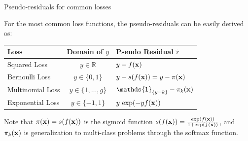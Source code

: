 \documentclass[11pt,compress,t,notes=noshow, xcolor=table]{beamer}
\begin{document}
\begin{vbframe}{Pseudo-residuals for common losses}

For the most common loss functions, the pseudo-residuals can be easily derived as:

\lz

\begin{table}[ht]
\centering
\begin{tabular}{|l|c|l|}
\hline
\textbf{Loss} & \textbf{Domain of $y$} & \textbf{Pseudo Residual $\tilde r$} \\ \hline
Squared Loss & $y \in \mathbb{R}$ & $y - f(\mathbf{x})$ \\ \hline
Bernoulli Loss & $y \in \{0,1\}$ & $y - s(f(\mathbf{x}))=y-\pi(\mathbf{x})$ \\ \hline
Multinomial Loss & $y \in \{1,\dots,g\}$ & $\mathds{1}_{\{y=k\}} - \pi_k(\xv)$ \\ \hline
Exponential Loss & $y \in \{-1,1\}$ & $y\,\exp(-yf(\mathbf{x}))$ \\ \hline
\end{tabular}
\end{table}

\lz

Note that $\pi(\mathbf{x})=s(f(\mathbf{x}))$ is the sigmoid function $s(f(\mathbf{x}))=\frac{\exp(f(\mathbf{x}))}{1+\exp(f(\mathbf{x}))}$, and $\pi_k(\mathbf{x})$ is generalization to multi-class problems through the softmax function.

\end{vbframe}



\endlecture
\end{document}
